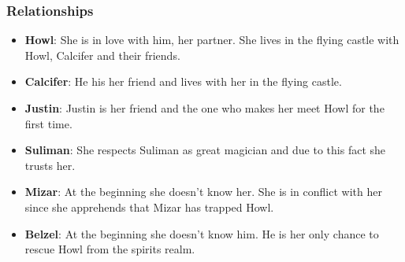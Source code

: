 




\subsubsection*{Relationships}
\begin{itemize}
\item \textbf{Howl}: She is in love with him, her partner. She lives in the flying castle with Howl, Calcifer and their friends.
\item \textbf{Calcifer}: He his her friend and lives with her in the flying castle.
\item \textbf{Justin}: Justin is her friend and the one who makes her meet Howl for the first time.
\item \textbf{Suliman}: She respects Suliman as great magician and due to this fact she trusts her.
\item \textbf{Mizar}: At the beginning she doesn’t know her. She is in conflict with her since she apprehends that Mizar has trapped Howl.
\item \textbf{Belzel}: At the beginning she doesn’t know him. He is her only chance to rescue Howl from the spirits realm.
\end{itemize}


